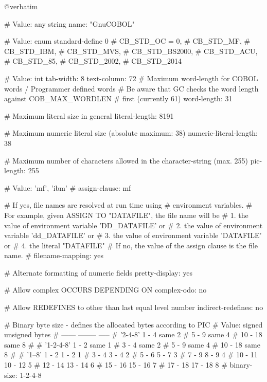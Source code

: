 @verbatim


# Value: any string
name: "GnuCOBOL"

# Value: enum
standard-define			0
#        CB_STD_OC = 0,
#        CB_STD_MF,
#        CB_STD_IBM,
#        CB_STD_MVS,
#        CB_STD_BS2000,
#        CB_STD_ACU,
#        CB_STD_85,
#        CB_STD_2002,
#        CB_STD_2014

# Value: int
tab-width:			8
text-column:			72
# Maximum word-length for COBOL words / Programmer defined words
# Be aware that GC checks the word length against COB_MAX_WORDLEN
# first (currently 61)
word-length:			31

# Maximum literal size in general
literal-length:			8191

# Maximum numeric literal size (absolute maximum: 38)
numeric-literal-length:	38

# Maximum number of characters allowed in the character-string (max. 255)
pic-length:				255

# Value: 'mf', 'ibm'
#
assign-clause:			mf

# If yes, file names are resolved at run time using
# environment variables.
# For example, given ASSIGN TO "DATAFILE", the file name will be
#  1. the value of environment variable 'DD_DATAFILE' or
#  2. the value of environment variable 'dd_DATAFILE' or
#  3. the value of environment variable 'DATAFILE' or
#  4. the literal "DATAFILE"
# If no, the value of the assign clause is the file name.
#
filename-mapping:		yes

# Alternate formatting of numeric fields
pretty-display:			yes

# Allow complex OCCURS DEPENDING ON
complex-odo:			no

# Allow REDEFINES to other than last equal level number
indirect-redefines:		no

# Binary byte size - defines the allocated bytes according to PIC
# Value:         signed  unsigned  bytes
#                ------  --------  -----
# '2-4-8'        1 -  4    same        2
#                5 -  9    same        4
#               10 - 18    same        8
#
# '1-2-4-8'      1 -  2    same        1
#                3 -  4    same        2
#                5 -  9    same        4
#               10 - 18    same        8
#
# '1--8'         1 -  2    1 -  2      1
#                3 -  4    3 -  4      2
#                5 -  6    5 -  7      3
#                7 -  9    8 -  9      4
#               10 - 11   10 - 12      5
#               12 - 14   13 - 14      6
#               15 - 16   15 - 16      7
#               17 - 18   17 - 18      8
#
binary-size:			1-2-4-8

